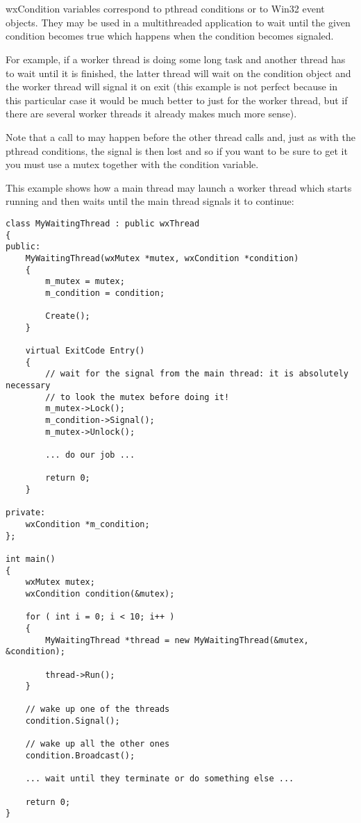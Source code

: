 \section{}\label{wxcondition}

wxCondition variables correspond to pthread conditions or to Win32 event
objects. They may be used in a multithreaded application to wait until the
given condition becomes true which happens when the condition becomes signaled.

For example, if a worker thread is doing some long task and another thread has
to wait until it is finished, the latter thread will wait on the condition
object and the worker thread will signal it on exit (this example is not
perfect because in this particular case it would be much better to just 
 for the worker thread, but if there are several
worker threads it already makes much more sense).

Note that a call to  may happen before the
other thread calls  and, just as with the
pthread conditions, the signal is then lost and so if you want to be sure to
get it you must use a mutex together with the condition variable.


This example shows how a main thread may launch a worker thread which starts
running and then waits until the main thread signals it to continue:

\begin{verbatim}
class MyWaitingThread : public wxThread
{
public:
    MyWaitingThread(wxMutex *mutex, wxCondition *condition)
    {
        m_mutex = mutex;
        m_condition = condition;

        Create();
    }

    virtual ExitCode Entry()
    {
        // wait for the signal from the main thread: it is absolutely necessary
        // to look the mutex before doing it!
        m_mutex->Lock();
        m_condition->Signal();
        m_mutex->Unlock();

        ... do our job ...

        return 0;
    }

private:
    wxCondition *m_condition;
};

int main()
{
    wxMutex mutex;
    wxCondition condition(&mutex);

    for ( int i = 0; i < 10; i++ )
    {
        MyWaitingThread *thread = new MyWaitingThread(&mutex, &condition);

        thread->Run();
    }

    // wake up one of the threads
    condition.Signal();

    // wake up all the other ones
    condition.Broadcast();

    ... wait until they terminate or do something else ...

    return 0;
}
\end{verbatim}

